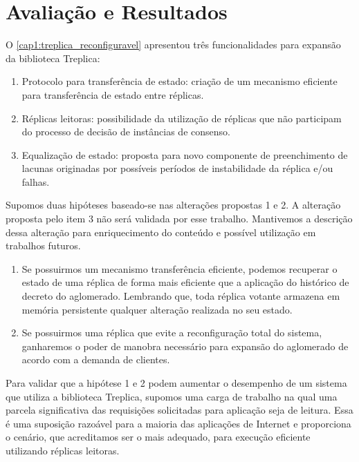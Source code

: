 \chapter{Avaliação e Resultados}\label{cap3}

O \autoref{cap1:treplica_reconfiguravel} apresentou três funcionalidades para expansão da
biblioteca Treplica:

\begin{enumerate}
  \item Protocolo para transferência de estado: criação de um mecanismo eficiente para
    transferência de estado entre réplicas.
  \item Réplicas leitoras: possibilidade da utilização de réplicas que não participam do
    processo de decisão de instâncias de consenso.
  \item Equalização de estado: proposta para novo componente de preenchimento de lacunas
    originadas por possíveis períodos de instabilidade da réplica e/ou falhas.
\end{enumerate}

Supomos duas hipóteses baseado-se nas alterações propostas 1 e 2. A alteração proposta
pelo item 3 não será validada por esse trabalho. Mantivemos a descrição dessa alteração
para enriquecimento do conteúdo e possível utilização em trabalhos futuros.

\begin{enumerate}
  \item Se possuirmos um mecanismo transferência eficiente, podemos recuperar o estado de
    uma réplica de forma mais eficiente que a aplicação do histórico de decreto do
    aglomerado. Lembrando que, toda réplica votante armazena em memória persistente
    qualquer alteração realizada no seu estado.
  \item Se possuirmos uma réplica que evite a reconfiguração total do sistema, ganharemos
    o poder de manobra necessário para expansão do aglomerado de acordo com a demanda de
    clientes.
\end{enumerate}

Para validar que a hipótese 1 e 2 podem aumentar o desempenho de um sistema que utiliza a
biblioteca Treplica, supomos uma carga de trabalho na qual uma parcela significativa das
requisições solicitadas para aplicação seja de leitura. Essa é uma suposição razoável para
a maioria das aplicações de Internet \cite{tpc02} e proporciona o cenário, que acreditamos
ser o mais adequado, para execução eficiente utilizando réplicas leitoras.

